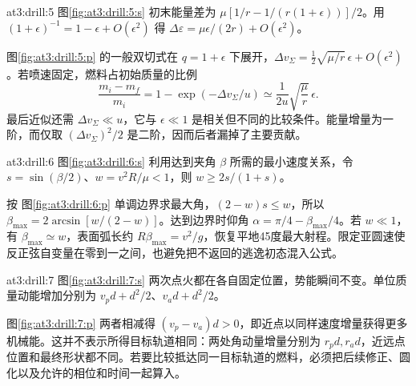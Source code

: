 \begin{drillsolution}{at3:drill:5}
图\ref{fig:at3:drill:5:s} 初末能量差为 $\mu[1/r-1/(r(1+\epsilon))]/2$。用 $(1+\epsilon)^{-1}=1-\epsilon+O(\epsilon^2)$ 得 $\Delta\varepsilon=\mu\epsilon/(2r)+O(\epsilon^2)$。

图\ref{fig:at3:drill:5:p} 的一般双切式在 $q=1+\epsilon$ 下展开，$\Delta v_\Sigma=\tfrac12\sqrt{\mu/r}\,\epsilon+O(\epsilon^2)$。若喷速固定，燃料占初始质量的比例
\[\frac{m_i-m_f}{m_i}=1-\exp(-\Delta v_\Sigma/u)\simeq\frac1{2u}\sqrt{\frac\mu r}\,\epsilon.\]
最后近似还需 $\Delta v_\Sigma\ll u$，它与 $\epsilon\ll1$ 是相关但不同的比较条件。能量增量为一阶，而仅取 $(\Delta v_\Sigma)^2/2$ 是二阶，因而后者漏掉了主要贡献。\end{drillsolution}
\begin{drillsolution}{at3:drill:6}
  图\ref{fig:at3:drill:6:s} 利用达到夹角 $\beta$ 所需的最小速度关系，令 $s=\sin(\beta/2)$、$w=v^2R/\mu<1$，则 $w\ge2s/(1+s)$。

  按 图\ref{fig:at3:drill:6:p} 单调边界求最大角，$(2-w)s\le w$，所以 $\beta_{\max}=2\arcsin[w/(2-w)]$。达到边界时仰角 $\alpha=\pi/4-\beta_{\max}/4$。若 $w\ll1$，有 $\beta_{\max}\simeq w$，表面弧长约 $R\beta_{\max}=v^2/g$，恢复平地45度最大射程。限定亚圆速使反正弦自变量在零到一之间，也避免把不返回的逃逸初态混入公式。\end{drillsolution}
\begin{drillsolution}{at3:drill:7}
  图\ref{fig:at3:drill:7:s} 两次点火都在各自固定位置，势能瞬间不变。单位质量动能增加分别为 $v_pd+d^2/2$、$v_ad+d^2/2$。

  图\ref{fig:at3:drill:7:p} 两者相减得 $(v_p-v_a)d>0$，即近点以同样速度增量获得更多机械能。这并不表示所得目标轨道相同：两处角动量增量分别为 $r_pd,r_ad$，近远点位置和最终形状都不同。若要比较抵达同一目标轨道的燃料，必须把后续修正、圆化以及允许的相位和时间一起算入。\end{drillsolution}
